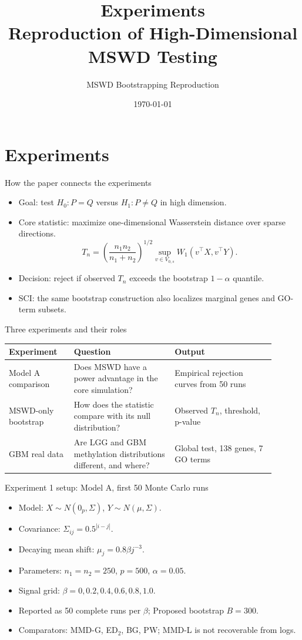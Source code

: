 \documentclass[aspectratio=169,11pt]{beamer}
\title[Experiments]{Experiments\\Reproduction of High-Dimensional MSWD Testing}
\author{MSWD Bootstrapping Reproduction}
\date{\today}
\begin{document}
\section{Experiments}

\begin{frame}[plain]
  \titlepage
\end{frame}

\begin{frame}{How the paper connects the experiments}
\begin{itemize}
  \item Goal: test \(H_0:P=Q\) versus \(H_1:P\neq Q\) in high dimension.
  \item Core statistic: maximize one-dimensional Wasserstein distance over sparse directions.
  \[
  T_n=\left(\frac{n_1n_2}{n_1+n_2}\right)^{1/2}
  \sup_{v\in V_{0,s}} W_1(v^\top X,v^\top Y).
  \]
  \item Decision: reject if observed \(T_n\) exceeds the bootstrap \(1-\alpha\) quantile.
  \item SCI: the same bootstrap construction also localizes marginal genes and GO-term subsets.
\end{itemize}
\end{frame}

\begin{frame}{Three experiments and their roles}
\begin{tabular}{p{0.22\linewidth}p{0.34\linewidth}p{0.34\linewidth}}
\toprule
Experiment & Question & Output \\
\midrule
Model A comparison & Does MSWD have a power advantage in the core simulation? & Empirical rejection curves from 50 runs \\
MSWD-only bootstrap & How does the statistic compare with its null distribution? & Observed \(T_n\), threshold, p-value \\
GBM real data & Are LGG and GBM methylation distributions different, and where? & Global test, 138 genes, 7 GO terms \\
\bottomrule
\end{tabular}
\end{frame}

\begin{frame}{Experiment 1 setup: Model A, first 50 Monte Carlo runs}
\begin{itemize}
  \item Model: \(X\sim N(0_p,\Sigma)\), \(Y\sim N(\mu,\Sigma)\).
  \item Covariance: \(\Sigma_{ij}=0.5^{|i-j|}\).
  \item Decaying mean shift: \(\mu_j=0.8\beta j^{-3}\).
  \item Parameters: \(n_1=n_2=250\), \(p=500\), \(\alpha=0.05\).
  \item Signal grid: \(\beta=0,0.2,0.4,0.6,0.8,1.0\).
  \item Reported as 50 complete runs per \(\beta\); Proposed bootstrap \(B=300\).
  \item Comparators: MMD-G, ED$_2$, BG, PW; MMD-L is not recoverable from logs.
\end{itemize}
\end{frame}
\end{document}
